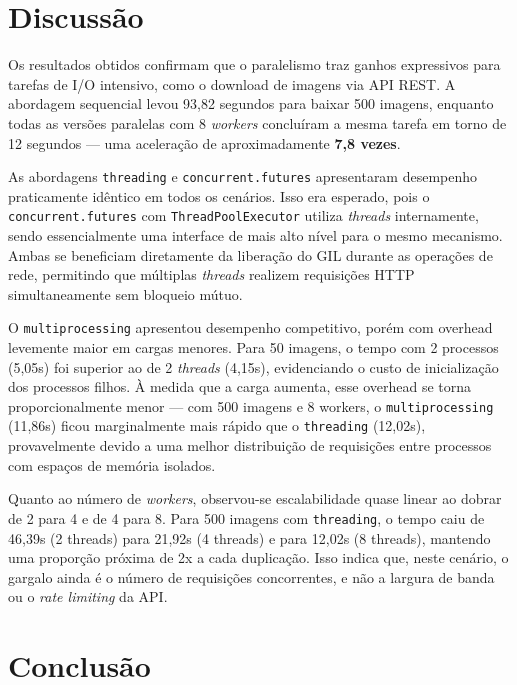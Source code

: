\documentclass[12pt]{article}
\begin{document}
\section{Discussão}

Os resultados obtidos confirmam que o paralelismo traz ganhos expressivos para
tarefas de I/O intensivo, como o download de imagens via API REST. A abordagem
sequencial levou 93,82 segundos para baixar 500 imagens, enquanto todas as
versões paralelas com 8 \textit{workers} concluíram a mesma tarefa em torno de
12 segundos — uma aceleração de aproximadamente \textbf{7,8 vezes}.

As abordagens \texttt{threading} e \texttt{concurrent.futures} apresentaram
desempenho praticamente idêntico em todos os cenários. Isso era esperado, pois o
\texttt{concurrent.futures} com \texttt{ThreadPoolExecutor} utiliza
\textit{threads} internamente, sendo essencialmente uma interface de mais alto
nível para o mesmo mecanismo. Ambas se beneficiam diretamente da liberação do
GIL durante as operações de rede, permitindo que múltiplas \textit{threads}
realizem requisições HTTP simultaneamente sem bloqueio mútuo.

O \texttt{multiprocessing} apresentou desempenho competitivo, porém com overhead
levemente maior em cargas menores. Para 50 imagens, o tempo com 2 processos
(5,05s) foi superior ao de 2 \textit{threads} (4,15s), evidenciando o custo de
inicialização dos processos filhos. À medida que a carga aumenta, esse overhead
se torna proporcionalmente menor — com 500 imagens e 8 workers, o
\texttt{multiprocessing} (11,86s) ficou marginalmente mais rápido que o
\texttt{threading} (12,02s), provavelmente devido a uma melhor distribuição de
requisições entre processos com espaços de memória isolados.

Quanto ao número de \textit{workers}, observou-se escalabilidade quase linear
ao dobrar de 2 para 4 e de 4 para 8. Para 500 imagens com \texttt{threading},
o tempo caiu de 46,39s (2 threads) para 21,92s (4 threads) e para 12,02s (8
threads), mantendo uma proporção próxima de 2x a cada duplicação. Isso indica
que, neste cenário, o gargalo ainda é o número de requisições concorrentes, e
não a largura de banda ou o \textit{rate limiting} da API.


\section{Conclusão}
\end{document}
